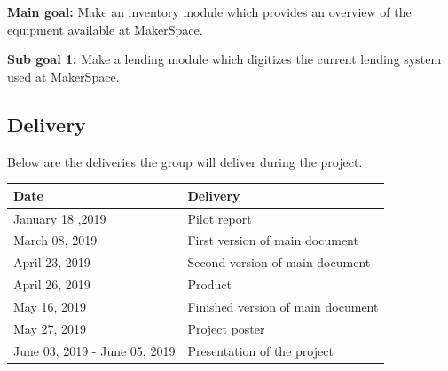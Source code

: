 
\textbf{Main goal:} Make an inventory module which provides an overview of the equipment available at MakerSpace.

\textbf{Sub goal 1:} Make a lending module which digitizes the current lending system used at MakerSpace.





\subsection{Delivery}

Below are the deliveries the group will deliver during the project.%

\begin{tabu} to 1.2\textwidth { | X[l] | X[c] | }
    \hline
    \textbf{Date} & \textbf{Delivery} \\
    \hline
    January 18 ,2019 & Pilot report \\
    \hline
    March 08, 2019 & First version of main document \\
    \hline
    April 23, 2019 & Second version of main document \\
    \hline
    April 26, 2019 & Product \\
    \hline
    May 16, 2019 & Finished version of main document \\
    \hline
    May 27, 2019 & Project poster \\
    \hline
   June 03, 2019 - June 05, 2019 & Presentation of the project \\
    \hline
    \end{tabu}
    
